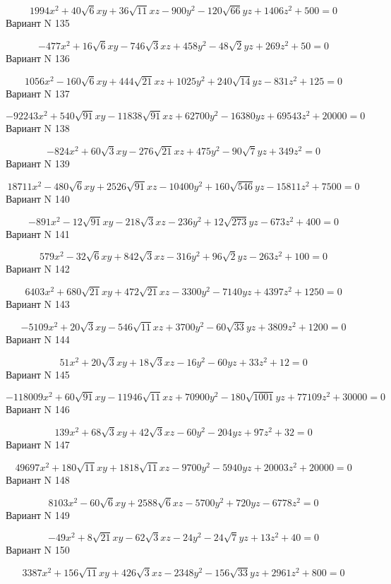 \documentclass[11pt]{report}
\begin{document}
$$1994 x^{2} + 40 \sqrt{6} x y + 36 \sqrt{11} x z - 900 y^{2} - 120 \sqrt{66} y z + 1406 z^{2} + 500 = 0$$Вариант N 135

$$- 477 x^{2} + 16 \sqrt{6} x y - 746 \sqrt{3} x z + 458 y^{2} - 48 \sqrt{2} y z + 269 z^{2} + 50 = 0$$Вариант N 136

$$1056 x^{2} - 160 \sqrt{6} x y + 444 \sqrt{21} x z + 1025 y^{2} + 240 \sqrt{14} y z - 831 z^{2} + 125 = 0$$Вариант N 137

$$- 92243 x^{2} + 540 \sqrt{91} x y - 11838 \sqrt{91} x z + 62700 y^{2} - 16380 y z + 69543 z^{2} + 20000 = 0$$Вариант N 138

$$- 824 x^{2} + 60 \sqrt{3} x y - 276 \sqrt{21} x z + 475 y^{2} - 90 \sqrt{7} y z + 349 z^{2} = 0$$Вариант N 139

$$18711 x^{2} - 480 \sqrt{6} x y + 2526 \sqrt{91} x z - 10400 y^{2} + 160 \sqrt{546} y z - 15811 z^{2} + 7500 = 0$$Вариант N 140

$$- 891 x^{2} - 12 \sqrt{91} x y - 218 \sqrt{3} x z - 236 y^{2} + 12 \sqrt{273} y z - 673 z^{2} + 400 = 0$$Вариант N 141

$$579 x^{2} - 32 \sqrt{6} x y + 842 \sqrt{3} x z - 316 y^{2} + 96 \sqrt{2} y z - 263 z^{2} + 100 = 0$$Вариант N 142

$$6403 x^{2} + 680 \sqrt{21} x y + 472 \sqrt{21} x z - 3300 y^{2} - 7140 y z + 4397 z^{2} + 1250 = 0$$Вариант N 143

$$- 5109 x^{2} + 20 \sqrt{3} x y - 546 \sqrt{11} x z + 3700 y^{2} - 60 \sqrt{33} y z + 3809 z^{2} + 1200 = 0$$Вариант N 144

$$51 x^{2} + 20 \sqrt{3} x y + 18 \sqrt{3} x z - 16 y^{2} - 60 y z + 33 z^{2} + 12 = 0$$Вариант N 145

$$- 118009 x^{2} + 60 \sqrt{91} x y - 11946 \sqrt{11} x z + 70900 y^{2} - 180 \sqrt{1001} y z + 77109 z^{2} + 30000 = 0$$Вариант N 146

$$139 x^{2} + 68 \sqrt{3} x y + 42 \sqrt{3} x z - 60 y^{2} - 204 y z + 97 z^{2} + 32 = 0$$Вариант N 147

$$49697 x^{2} + 180 \sqrt{11} x y + 1818 \sqrt{11} x z - 9700 y^{2} - 5940 y z + 20003 z^{2} + 20000 = 0$$Вариант N 148

$$8103 x^{2} - 60 \sqrt{6} x y + 2588 \sqrt{6} x z - 5700 y^{2} + 720 y z - 6778 z^{2} = 0$$Вариант N 149

$$- 49 x^{2} + 8 \sqrt{21} x y - 62 \sqrt{3} x z - 24 y^{2} - 24 \sqrt{7} y z + 13 z^{2} + 40 = 0$$Вариант N 150

$$3387 x^{2} + 156 \sqrt{11} x y + 426 \sqrt{3} x z - 2348 y^{2} - 156 \sqrt{33} y z + 2961 z^{2} + 800 = 0$$
\end{document}
